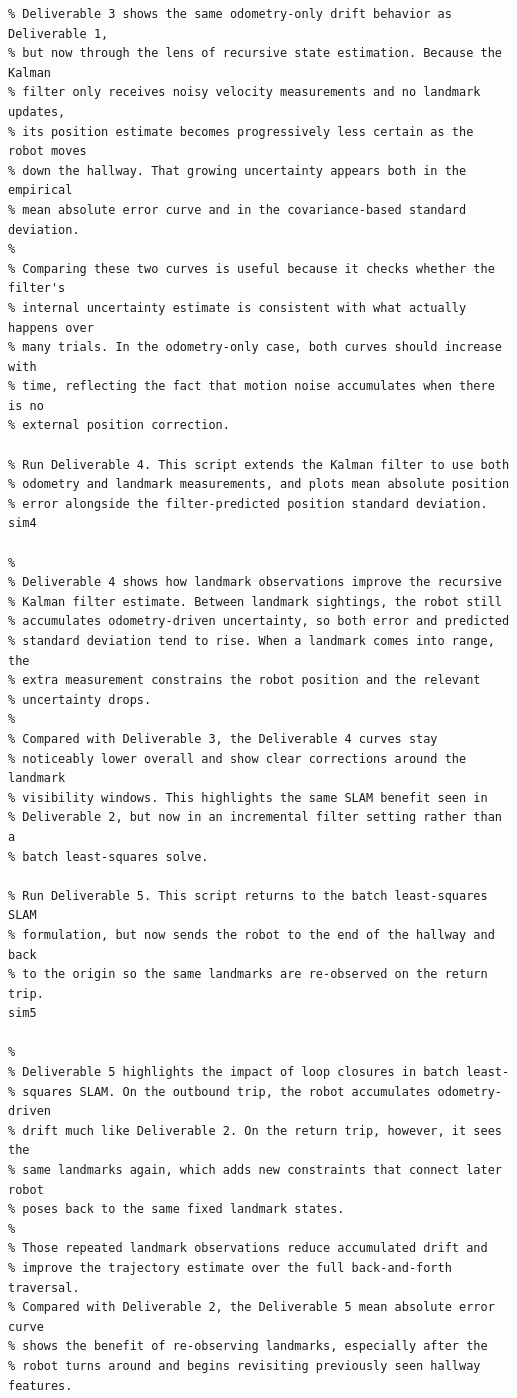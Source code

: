 \documentclass[11pt]{article}
\begin{document}
\begin{lstlisting}[caption={sim.m}, label={lst:simm}]
%
% Deliverable 3 shows the same odometry-only drift behavior as Deliverable 1,
% but now through the lens of recursive state estimation. Because the Kalman
% filter only receives noisy velocity measurements and no landmark updates,
% its position estimate becomes progressively less certain as the robot moves
% down the hallway. That growing uncertainty appears both in the empirical
% mean absolute error curve and in the covariance-based standard deviation.
%
% Comparing these two curves is useful because it checks whether the filter's
% internal uncertainty estimate is consistent with what actually happens over
% many trials. In the odometry-only case, both curves should increase with
% time, reflecting the fact that motion noise accumulates when there is no
% external position correction.

% Run Deliverable 4. This script extends the Kalman filter to use both
% odometry and landmark measurements, and plots mean absolute position
% error alongside the filter-predicted position standard deviation.
sim4

%
% Deliverable 4 shows how landmark observations improve the recursive
% Kalman filter estimate. Between landmark sightings, the robot still
% accumulates odometry-driven uncertainty, so both error and predicted
% standard deviation tend to rise. When a landmark comes into range, the
% extra measurement constrains the robot position and the relevant
% uncertainty drops.
%
% Compared with Deliverable 3, the Deliverable 4 curves stay
% noticeably lower overall and show clear corrections around the landmark
% visibility windows. This highlights the same SLAM benefit seen in
% Deliverable 2, but now in an incremental filter setting rather than a
% batch least-squares solve.

% Run Deliverable 5. This script returns to the batch least-squares SLAM
% formulation, but now sends the robot to the end of the hallway and back
% to the origin so the same landmarks are re-observed on the return trip.
sim5

%
% Deliverable 5 highlights the impact of loop closures in batch least-
% squares SLAM. On the outbound trip, the robot accumulates odometry-driven
% drift much like Deliverable 2. On the return trip, however, it sees the
% same landmarks again, which adds new constraints that connect later robot
% poses back to the same fixed landmark states.
%
% Those repeated landmark observations reduce accumulated drift and
% improve the trajectory estimate over the full back-and-forth traversal.
% Compared with Deliverable 2, the Deliverable 5 mean absolute error curve
% shows the benefit of re-observing landmarks, especially after the
% robot turns around and begins revisiting previously seen hallway features.

\end{lstlisting}
\end{document}
